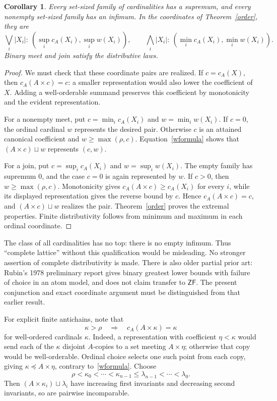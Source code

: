\documentclass[11pt,a4paper]{article}
\newcommand{\ZF}{\mathsf{ZF}}
\newtheorem{corollary}[theorem]{Corollary}
\theoremstyle{definition}
\theoremstyle{remark}
\begin{document}
\begin{corollary}\label{bounds}
Every set-sized family of cardinalities has a supremum, and every nonempty set-sized family has an infimum. In the coordinates of Theorem~\ref{order}, they are
\[
 \bigvee_i|X_i|:\ (\sup_i c_A(X_i),\sup_i w(X_i)),\qquad
 \bigwedge_i|X_i|:\ (\min_i c_A(X_i),\min_i w(X_i)).
\]
Binary meet and join satisfy the distributive laws.
\end{corollary}
\begin{proof}
We must check that these coordinate pairs are realized. If $c=c_A(X)$, then $c_A(A\times c)=c$: a smaller representation would also lower the coefficient of $X$. Adding a well-orderable summand preserves this coefficient by monotonicity and the evident representation.

For a nonempty meet, put $c=\min_i c_A(X_i)$ and $w=\min_iw(X_i)$. If $c=0$, the ordinal cardinal $w$ represents the desired pair. Otherwise $c$ is an attained canonical coefficient and $w\ge\max(\rho,c)$. Equation~\eqref{wformula} shows that $(A\times c)\sqcup w$ represents $(c,w)$.

For a join, put $c=\sup_i c_A(X_i)$ and $w=\sup_iw(X_i)$. The empty family has supremum $0$, and the case $c=0$ is again represented by $w$. If $c>0$, then $w\ge\max(\rho,c)$. Monotonicity gives $c_A(A\times c)\ge c_A(X_i)$ for every $i$, while its displayed representation gives the reverse bound by $c$. Hence $c_A(A\times c)=c$, and $(A\times c)\sqcup w$ realizes the pair. Theorem~\ref{order} proves the extremal properties. Finite distributivity follows from minimum and maximum in each ordinal coordinate.
\end{proof}

The class of all cardinalities has no top: there is no empty infimum. Thus ``complete lattice'' without this qualification would be misleading. No stronger assertion of complete distributivity is made. There is also older partial prior art: Rubin's 1978 preliminary report \cite{Rubin} gives binary greatest lower bounds with failure of choice in an atom model, and does not claim transfer to $\ZF$. The present conjunction and exact coordinate argument must be distinguished from that earlier result.

For explicit finite antichains, note that
\begin{equation}\label{largecoeff}
 \kappa>\rho\quad\Longrightarrow\quad c_A(A\times\kappa)=\kappa
\end{equation}
for well-ordered cardinals $\kappa$. Indeed, a representation with coefficient $\eta<\kappa$ would send each of the $\kappa$ disjoint $A$-copies to a set meeting $A\times\eta$; otherwise that copy would be well-orderable. Ordinal choice selects one such point from each copy, giving $\kappa\preccurlyeq A\times\eta$, contrary to~\eqref{wformula}. Choose
\[
 \rho<\kappa_0<\cdots<\kappa_{n-1}
 \le\lambda_{n-1}<\cdots<\lambda_0.
\]
Then $(A\times\kappa_i)\sqcup\lambda_i$ have increasing first invariants and decreasing second invariants, so are pairwise incomparable.
\end{document}

